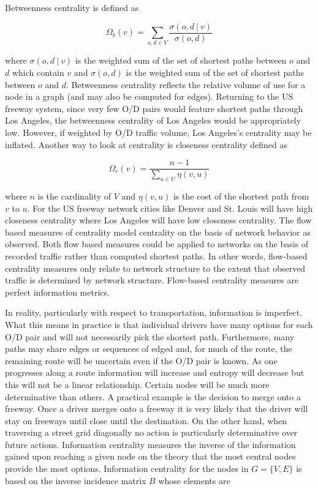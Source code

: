 Betweenness centrality is defined as

\begin{equation}
	\Omega_b(v) = \sum_{o, d \in V}\frac{\sigma(o, d\ |\ v)}{\sigma(o, d)}\label{eq:betweenness_centrality}
\end{equation}

where $\sigma(o, d\ |\ v)$ is the weighted sum of the set of shortest paths between $o$ and $d$ which contain $v$ and $\sigma(o, d)$ is the weighted sum of the set of shortest paths between $o$ and $d$. Betweenness centrality reflects the relative volume of use for a node in a graph (and may also be computed for edges). Returning to the US freeway system, since very few O/D pairs would feature shortest paths through Los Angeles, the betweenness centrality of Los Angeles would be appropriately low. However, if weighted by O/D traffic volume, Los Angeles's centrality may be inflated. Another way to look at centrality is closeness centrality defined as

\begin{equation}
	\Omega_c(v) = \frac{n - 1}{\sum_{u \in U} \eta(v, u)}
\end{equation}

where $n$ is the cardinality of $V$ and $\eta(v, u)$ is the cost of the shortest path from $v$ to $u$. For the US freeway network cities like Denver and St. Louis will have high closeness centrality where Los Angeles will have low closeness centrality. The flow based measures of centrality model centrality on the basis of network behavior as observed. Both flow based measures could be applied to networks on the basis of recorded traffic rather than computed shortest paths. In other words, flow-based centrality measures only relate to network structure to the extent that observed traffic is determined by network structure. Flow-based centrality measures are perfect information metrics.

In reality, particularly with respect to transportation, information is imperfect. What this means in practice is that individual drivers have many options for each O/D pair and will not necessarily pick the shortest path. Furthermore, many paths may share edges or sequences of edged and, for much of the route, the remaining route will be uncertain even if the O/D pair is known. As one progresses along a route information will increase and entropy will decrease but this will not be a linear relationship. Certain nodes will be much more determinative than others. A practical example is the decision to merge onto a freeway. Once a driver merges onto a freeway it is very likely that the driver will stay on freeways until close until the destination. On the other hand, when traversing a street grid diagonally no action is particularly determinative over future actions. Information centrality measures the inverse of the information gained upon reaching a given node on the theory that the most central nodes provide the most options. Information centrality for the nodes in $G = \{V, E\}$ is based on the inverse incidence matrix $B$ whose elements are


